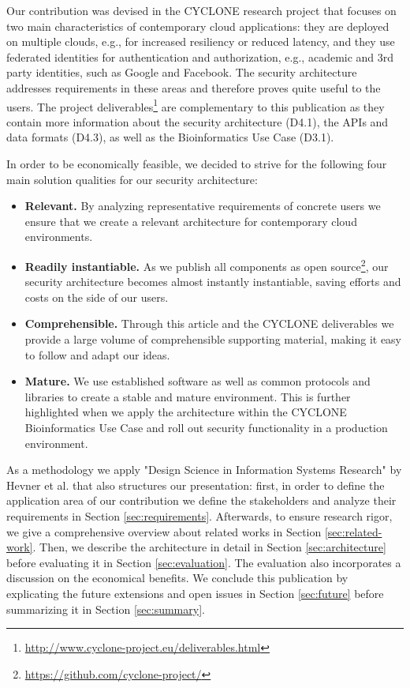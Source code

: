 \documentclass{llncs}
\begin{document}
Our contribution was devised in the CYCLONE research project that focuses on two main characteristics of contemporary cloud applications: they are deployed on multiple clouds, e.g., for increased resiliency or reduced latency, and they use federated identities for authentication and authorization, e.g., academic and 3rd party identities, such as Google and Facebook. The security architecture addresses requirements in these areas and therefore proves quite useful to the users. The project deliverables\footnote{\url{http://www.cyclone-project.eu/deliverables.html}} are complementary to this publication as they contain more information about the security architecture (D4.1), the APIs and data formats (D4.3), as well as the Bioinformatics Use Case (D3.1).

In order to be economically feasible, we decided to strive for the following four main solution qualities for our security architecture:

\begin{itemize}
	\item \textbf{Relevant.} By analyzing representative requirements of concrete users we ensure that we create a relevant architecture for contemporary cloud environments.
	\item \textbf{Readily instantiable.} As we publish all components as open source\footnote{\url{https://github.com/cyclone-project/}}, our security architecture becomes almost instantly instantiable, saving efforts and costs on the side of our users.
	\item \textbf{Comprehensible.} Through this article and the CYCLONE deliverables we provide a large volume of comprehensible supporting material, making it easy to follow and adapt our ideas.
	\item \textbf{Mature.} We use established software as well as common protocols and libraries to create a stable and mature environment. This is further highlighted when we apply the architecture within the CYCLONE Bioinformatics Use Case and roll out security functionality in a production environment.
\end{itemize}

As a methodology we apply "Design Science in Information Systems Research" by Hevner et al. \cite{HMPR04} that also structures our presentation: first, in order to define the application area of our contribution we define the stakeholders and analyze their requirements in Section \ref{sec:requirements}. Afterwards, to ensure research rigor, we give a comprehensive overview about related works in Section \ref{sec:related-work}. Then, we describe the architecture in detail in Section \ref{sec:architecture} before evaluating it in Section \ref{sec:evaluation}. The evaluation also incorporates a discussion on the economical benefits. We conclude this publication by explicating the future extensions and open issues in Section \ref{sec:future} before summarizing it in Section \ref{sec:summary}.
\end{document}
